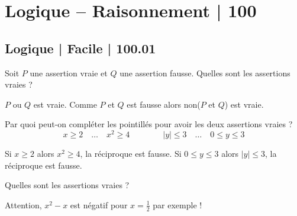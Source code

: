 


\section{Logique -- Raisonnement | 100}
\subsection{Logique | Facile | 100.01}


\begin{question}
Soit $P$ une assertion vraie et $Q$ une assertion fausse. Quelles sont les assertions vraies ?
\begin{answers}



\end{answers}
\begin{explanations}
$P$ ou $Q$ est vraie. Comme $P$ et $Q$ est fausse alors non($P$ et $Q$) est vraie.
\end{explanations}

\end{question}


\begin{question}
Par quoi peut-on compléter les pointillés pour avoir les deux assertions vraies ?
$$x\ge 2 \quad \ldots \quad x^2 \ge 4  \qquad \qquad |y| \le 3 \quad \ldots \quad 0 \le y \le 3$$
\begin{answers}


    
\end{answers}
\begin{explanations}
Si $x\ge 2$ alors $x^2 \ge 4$, la réciproque est fausse.
Si $0 \le y \le 3$ alors $|y| \le 3$, la réciproque est fausse.
\end{explanations}
\end{question}


\begin{question}
Quelles sont les assertions vraies ?
\begin{answers}    



\end{answers}
\begin{explanations}
Attention, $x^2-x$ est négatif pour $x=\frac12$ par exemple !
\end{explanations}
\end{question}


